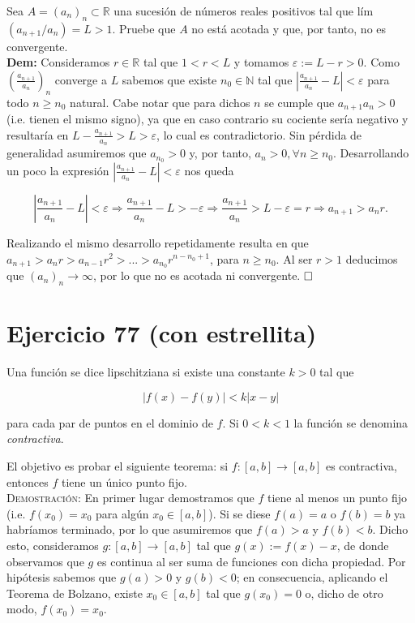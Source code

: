 \documentclass{article}
\begin{document}
Sea $A = (a_n)_n \subset \mathbb{R}$ una sucesión de números reales positivos tal que lím$(a_{n + 1}/a_n) = L > 1$. Pruebe que $A$ no está acotada y que, por tanto, no es convergente. \\

\noindent\textbf{Dem:} Consideramos $r \in \mathbb{R}$ tal que $1 < r < L$ y tomamos $\varepsilon := L - r > 0$. Como $(\frac{a_{n + 1}}{a_n})_n$ converge a $L$ sabemos que existe $n_0 \in \mathbb{N}$ tal que $|\frac{a_{n + 1}}{a_n} - L| < \varepsilon$ para todo $n \geq n_0$ natural. Cabe notar que para dichos $n$ se cumple que $a_{n + 1}a_n > 0$ (i.e. tienen el mismo signo), ya que en caso contrario su cociente sería negativo y resultaría en $L - \frac{a_{n + 1}}{a_n} > L > \varepsilon$, lo cual es contradictorio. Sin pérdida de generalidad asumiremos que $a_{n_0} > 0$ y, por tanto, $a_n > 0, \forall n \geq n_0$. Desarrollando un poco la expresión $|\frac{a_{n + 1}}{a_n} - L| < \varepsilon$ nos queda

\[\left|\frac{a_{n + 1}}{a_n} - L\right| < \varepsilon \Longrightarrow \frac{a_{n + 1}}{a_n} - L > -\varepsilon \Longrightarrow \frac{a_{n + 1}}{a_n} > L - \varepsilon = r \Longrightarrow a_{n + 1} > a_nr.\]

Realizando el mismo desarrollo repetidamente resulta en que $a_{n + 1} > a_nr > a_{n - 1}r^2 > ... > a_{n_0}r^{n - n_0 + 1}$, para $n \geq n_0$. Al ser $r > 1$ deducimos que $(a_n)_n \longrightarrow \infty$, por lo que no es acotada ni convergente. $\hfill\square$

\newpage

\section{Ejercicio 77 (con estrellita)}

Una función se dice lipschitziana si existe una constante $k > 0$ tal que

\[|f(x) - f(y)| < k|x - y|\]

para cada par de puntos en el dominio de $f$. Si $0 < k < 1$ la función se denomina \textit{contractiva}.

El objetivo es probar el siguiente teorema: si $f : [a, b] \longrightarrow [a, b]$ es contractiva, entonces $f$ tiene un único punto fijo. \\

\noindent\textsc{Demostración}: En primer lugar demostramos que $f$ tiene al menos un punto fijo (i.e. $f(x_0) = x_0$ para algún $x_0 \in [a, b]$). Si se diese $f(a) = a$ o $f(b) = b$ ya habríamos terminado, por lo que asumiremos que $f(a) > a$ y $f(b) < b$. Dicho esto, consideramos $g : [a, b] \longrightarrow [a, b]$ tal que $g(x) := f(x) - x$, de donde observamos que $g$ es continua al ser suma de funciones con dicha propiedad. Por hipótesis sabemos que $g(a) > 0$ y $g(b) < 0$; en consecuencia, aplicando el Teorema de Bolzano, existe $x_0 \in [a, b]$ tal que $g(x_0) = 0$ o, dicho de otro modo, $f(x_0) = x_0$.
\end{document}
